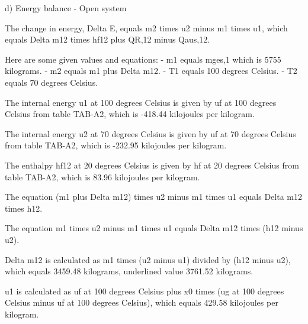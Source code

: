 d) Energy balance - Open system

The change in energy, Delta E, equals m2 times u2 minus m1 times u1, which equals Delta m12 times hf12 plus QR,12 minus Qaus,12.

Here are some given values and equations:
- m1 equals mges,1 which is 5755 kilograms.
- m2 equals m1 plus Delta m12.
- T1 equals 100 degrees Celsius.
- T2 equals 70 degrees Celsius.

The internal energy u1 at 100 degrees Celsius is given by uf at 100 degrees Celsius from table TAB-A2, which is -418.44 kilojoules per kilogram.

The internal energy u2 at 70 degrees Celsius is given by uf at 70 degrees Celsius from table TAB-A2, which is -232.95 kilojoules per kilogram.

The enthalpy hf12 at 20 degrees Celsius is given by hf at 20 degrees Celsius from table TAB-A2, which is 83.96 kilojoules per kilogram.

The equation (m1 plus Delta m12) times u2 minus m1 times u1 equals Delta m12 times h12.

The equation m1 times u2 minus m1 times u1 equals Delta m12 times (h12 minus u2).

Delta m12 is calculated as m1 times (u2 minus u1) divided by (h12 minus u2), which equals 3459.48 kilograms, underlined value 3761.52 kilograms.

u1 is calculated as uf at 100 degrees Celsius plus x0 times (ug at 100 degrees Celsius minus uf at 100 degrees Celsius), which equals 429.58 kilojoules per kilogram.